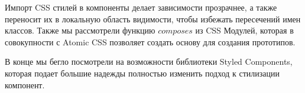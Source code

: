 Импорт CSS стилей в компоненты делает зависимости прозрачнее, а также переносит их в локальную область видимости, чтобы избежать пересечений имен классов. Также мы рассмотрели функцию $composes$ из CSS Модулей, которая в совокупности с Atomic CSS позволяет создать основу для создания прототипов.

В конце мы бегло посмотрели на возможности библиотеки Styled Components, которая подает большие надежды полностью изменить подход к стилизации компонент.













